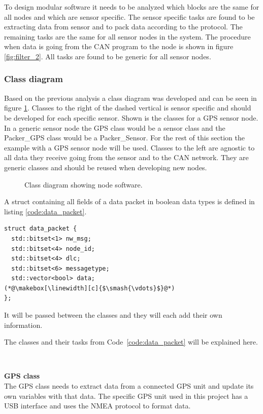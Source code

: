 To design modular software it needs to be analyzed which blocks are the same for all nodes and which are sensor specific.
The sensor specific tasks are found to be extracting data from sensor and to pack data according to the protocol.
The remaining tasks are the same for all sensor nodes in the system. 
The procedure when data is going from the CAN program to the node is shown in figure \ref{fig:filter_2}.
All tasks are found to be generic for all sensor nodes.

\subsubsection*{Class diagram}
Based on the previous analysis a class diagram was developed and can be seen in figure \ref{fig:node_class_diagram}.
Classes to the right of the dashed vertical is sensor specific and should be developed for each specific sensor.
Shown is the classes for a GPS sensor node. 
In a generic sensor node the GPS class would be a sensor class and the Packer\_GPS class would be a Packer\_Sensor.
For the rest of this section the example with a GPS sensor node will be used.
Classes to the left are agnostic to all data they receive going from the sensor and to the CAN network.
They are generic classes and should be reused when developing new nodes.

\begin{figure}[!h]
\centering
{}
\caption{Class diagram showing node software.}
\label{fig:node_class_diagram}
\end{figure}

A struct containing all fields of a data packet in boolean data types is defined in listing \ref{code:data_packet}.  

\begin{lstlisting}[caption=Struct for data packet.,label=code:data_packet]
struct data_packet {
  std::bitset<1> nw_msg;
  std::bitset<4> node_id;
  std::bitset<4> dlc;
  std::bitset<6> messagetype;
  std::vector<bool> data;
(*@\makebox[\linewidth][c]{$\smash{\vdots}$}@*)
};
\end{lstlisting}
It will be passed between the classes and they will each add their own information. 

The classes and their tasks from Code~\ref{code:data_packet} will be explained here.

~\\ \par \textbf{GPS class} ~ \\
The GPS class needs to extract data from a connected GPS unit and update its own variables with that data.
The specific GPS unit used in this project has a USB interface and uses the NMEA protocol to format data.

